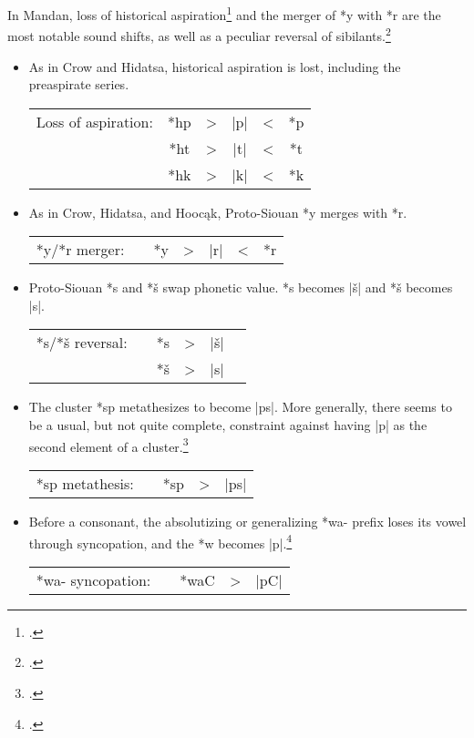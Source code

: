 \documentclass[output=paper]{LSP/langsci}
\begin{document}
In Mandan, loss of historical aspiration\footnote{\citealt[50]{CSD2006}.} and the merger of *y with *r are the most notable sound shifts, as well as a peculiar reversal of sibilants.\footnote{\citealt[126]{CSD2006}.}

\begin{itemize}
\item As in Crow and Hidatsa, historical aspiration is lost, including the preaspirate series.



\begin{tabular}[t]{c c c c c c }
 Loss of aspiration: & *hp & > & |p| & < & *p \\
& *ht & >	 & |t| & < & *t \\
& *hk & > & |k| & < & *k \\
\end{tabular}

\item As in Crow, Hidatsa, and Hooc\k{a}k, Proto-Siouan *y merges with *r.


\begin{tabular}[t]{c c c c c c c}
*y/*r merger: & & *y	 & > & |r| & < & *r
\end{tabular}
\item Proto-Siouan *s and *š swap phonetic value.  *s becomes |š| and *š becomes |s|.



\begin{tabular}[t]{c c c c c c }
*s/*š reversal: & & *s & > & |š| \\
& & *š & > & |s| \\
\end{tabular}

\item The cluster *sp metathesizes to become |ps|. More generally, there seems to be a usual, but not quite complete, constraint against having |p| as the second element of a cluster.\footnote{\citealt[275]{CSD2006}. }


\begin{tabular}[t]{c c c c c}
*sp metathesis:	 & & *sp & > & |ps|
\end{tabular} 

\item Before a consonant, the absolutizing or generalizing *wa- prefix loses its vowel through syncopation, and the *w becomes |p|.\footnote{\citealt[793]{CSD2006}.}


\begin{tabular}[t]{c c c c c }
*wa- syncopation: & & *waC & > & |pC|
\end{tabular}
\end{itemize} 
\end{document}
